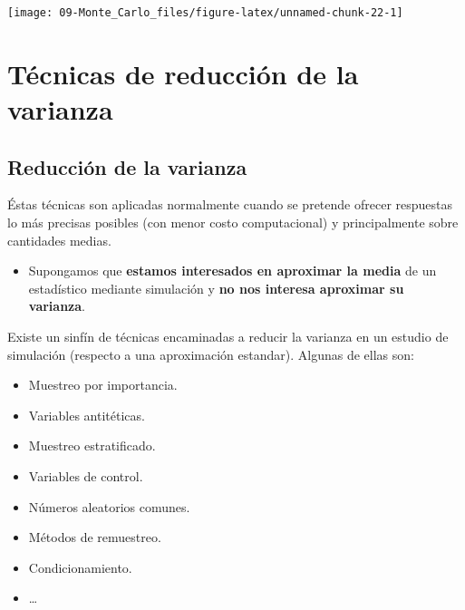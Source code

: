\documentclass[
]{book}
\newenvironment{Shaded}{\begin{snugshade}}{\end{snugshade}}
\newcommand{\CommentTok}[1]{\textcolor[rgb]{0.56,0.35,0.01}{\textit{#1}}}
\newcommand{\DataTypeTok}[1]{\textcolor[rgb]{0.13,0.29,0.53}{#1}}
\newcommand{\DecValTok}[1]{\textcolor[rgb]{0.00,0.00,0.81}{#1}}
\newcommand{\KeywordTok}[1]{\textcolor[rgb]{0.13,0.29,0.53}{\textbf{#1}}}
\newcommand{\NormalTok}[1]{#1}
\newcommand{\OperatorTok}[1]{\textcolor[rgb]{0.81,0.36,0.00}{\textbf{#1}}}
\providecommand{\tightlist}{%
  \setlength{\itemsep}{0pt}\setlength{\parskip}{0pt}}
\theoremstyle{break}
\theoremstyle{definition}
\theoremstyle{definition}
\theoremstyle{definition}
\theoremstyle{remark}
\begin{document}
\begin{Shaded}
\end{Shaded}

\begin{center}\texttt{[image: 09-Monte\_Carlo\_files/figure-latex/unnamed-chunk-22-1]} \end{center}

\hypertarget{tuxe9cnicas-de-reducciuxf3n-de-la-varianza}{%
\chapter{Técnicas de reducción de la varianza}\label{tuxe9cnicas-de-reducciuxf3n-de-la-varianza}}

\hypertarget{reducciuxf3n-de-la-varianza}{%
\section{Reducción de la varianza}\label{reducciuxf3n-de-la-varianza}}

Éstas técnicas son aplicadas normalmente cuando se pretende ofrecer respuestas
lo más precisas posibles (con menor costo computacional) y principalmente sobre cantidades medias.

\begin{itemize}
\tightlist
\item
  Supongamos que \textbf{estamos interesados en aproximar la media} de un
  estadístico mediante simulación y
  \textbf{no nos interesa aproximar su varianza}.
\end{itemize}

Existe un sinfín de técnicas encaminadas a reducir la varianza en un
estudio de simulación (respecto a una aproximación estandar).
Algunas de ellas son:

\begin{itemize}
\item
  Muestreo por importancia.
\item
  Variables antitéticas.
\item
  Muestreo estratificado.
\item
  Variables de control.
\item
  Números aleatorios comunes.
\item
  Métodos de remuestreo.
\item
  Condicionamiento.
\item
  \ldots{}
\end{itemize}
\end{document}
